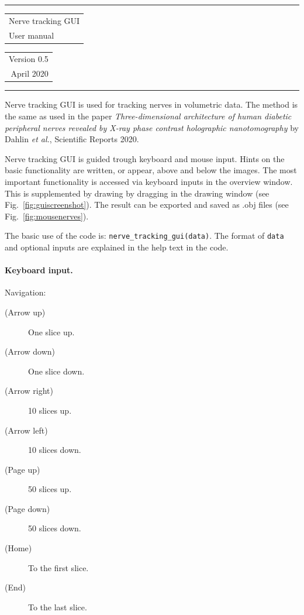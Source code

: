 \documentclass[paper=a4, fontsize=8pt]{article}
\begin{document}
	\begin{large}\hrule height 1pt
		\begin{tabular}{@{}l@{}} Nerve tracking GUI \\ User manual\end{tabular}
		\begin{tabular}{@{}r@{}} Version 0.5 \\ April 2020\end{tabular}\hrule	
	\end{large}\par\vspace{\baselineskip}
	
Nerve tracking GUI is used for tracking nerves in volumetric data. The method is the same as used in the paper \emph{Three-dimensional architecture of human diabetic peripheral nerves revealed by X-ray phase contrast holographic nanotomography} by Dahlin \emph{et al.}, Scientific Reports 2020.

Nerve tracking GUI is guided trough keyboard and mouse input. Hints on the basic functionality are written, or appear, above and below the images. The most important functionality is accessed via keyboard inputs in the overview window. This is supplemented by drawing by dragging in the drawing window (see Fig.~\ref{fig:guiscreenshot}). The result can be exported and saved as .obj files (see Fig.~\ref{fig:mousenerves}).

The basic use of the code is: \texttt{nerve\_tracking\_gui(data)}. The format of \texttt{data} and  optional inputs are explained in the help text in the code.

\paragraph{Keyboard input.} Navigation:
\begin{description}
		\item[(Arrow up)] One slice up.
		\item[(Arrow down)] One slice down.
		\item[(Arrow right)] 10 slices up.
		\item[(Arrow left)] 10 slices down.
		\item[(Page up)] 50 slices up.
		\item[(Page down)] 50 slices down.
		\item[(Home)] To the first slice.
		\item[(End)] To the last slice.
\end{description}
\end{document}
